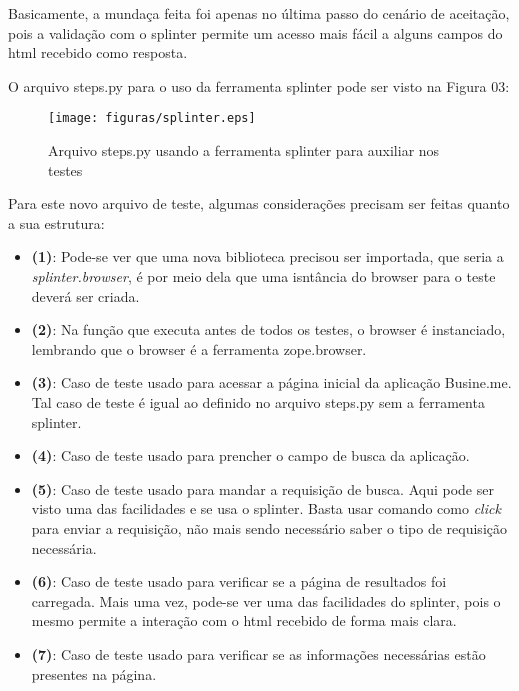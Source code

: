     Basicamente, a mundaça feita foi apenas no última passo do cenário de
    aceitação, pois a validação com o splinter permite um acesso mais fácil a
    alguns campos do html recebido como resposta.

    O arquivo steps.py para o uso da ferramenta splinter pode ser visto na
    Figura 03:

     \begin{figure}[h!]
        \centering
        \texttt{[image: figuras/splinter.eps]}
        \caption{Arquivo steps.py usando a ferramenta splinter para auxiliar nos
        testes}
    \end{figure}

    Para este novo arquivo de teste, algumas considerações precisam ser feitas
    quanto a sua estrutura:

    \begin{itemize}

        \item \textbf{(1)}: Pode-se ver que uma nova biblioteca precisou ser
            importada, que seria a \textit{splinter.browser}, é por meio dela
            que uma isntância do browser para o teste deverá ser criada.

        \item \textbf{(2)}: Na função que executa antes de todos os testes, o
            browser é instanciado, lembrando que o browser é a ferramenta
            zope.browser.

        \item \textbf{(3)}: Caso de teste usado para acessar a página inicial da
            aplicação Busine.me. Tal caso de teste é igual ao definido no
            arquivo steps.py sem a ferramenta splinter.

        \item \textbf{(4)}: Caso de teste usado para prencher o campo de busca
            da aplicação.

        \item \textbf{(5)}: Caso de teste usado para mandar a requisição de
            busca. Aqui pode ser visto uma das facilidades e se usa o splinter.
            Basta usar comando como \textit{click} para enviar a requisição,
            não mais sendo necessário saber o tipo de requisição necessária.

        \item \textbf{(6)}: Caso de teste usado para verificar se a página de
            resultados foi carregada. Mais uma vez, pode-se ver uma das
            facilidades do splinter, pois o mesmo permite a interação com o html
            recebido de forma mais clara.

        \item \textbf{(7)}: Caso de teste usado para verificar se as informações
            necessárias estão presentes na página.

    \end{itemize}

